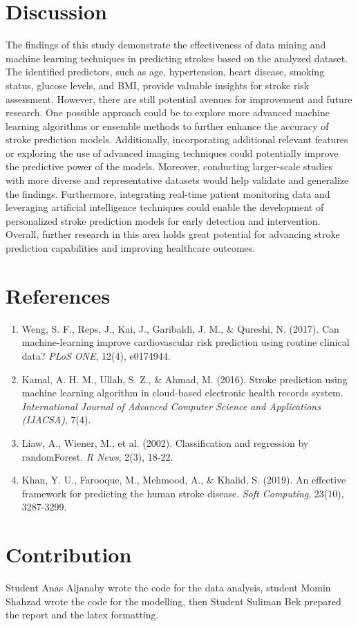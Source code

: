 \documentclass{article}
\begin{document}
\section{Discussion}

 The findings of this study demonstrate the effectiveness of data mining and machine learning techniques in predicting strokes based on the analyzed dataset. The identified predictors, such as age, hypertension, heart disease, smoking status, glucose levels, and BMI, provide valuable insights for stroke risk assessment. However, there are still potential avenues for improvement and future research. One possible approach could be to explore more advanced machine learning algorithms or ensemble methods to further enhance the accuracy of stroke prediction models. Additionally, incorporating additional relevant features or exploring the use of advanced imaging techniques could potentially improve the predictive power of the models. Moreover, conducting larger-scale studies with more diverse and representative datasets would help validate and generalize the findings. Furthermore, integrating real-time patient monitoring data and leveraging artificial intelligence techniques could enable the development of personalized stroke prediction models for early detection and intervention. Overall, further research in this area holds great potential for advancing stroke prediction capabilities and improving healthcare outcomes.

\section{References}

\begin{enumerate}
\item Weng, S. F., Reps, J., Kai, J., Garibaldi, J. M., \& Qureshi, N. (2017).
Can machine-learning improve cardiovascular risk prediction using routine clinical data?
{\em PLoS ONE}, 12(4), e0174944.

\item Kamal, A. H. M., Ullah, S. Z., \& Ahmad, M. (2016).
Stroke prediction using machine learning algorithm in cloud-based electronic health records system.
{\em International Journal of Advanced Computer Science and Applications (IJACSA)}, 7(4).

\item Liaw, A., Wiener, M., et al. (2002).
Classification and regression by randomForest.
{\em R News}, 2(3), 18-22.

\item Khan, Y. U., Farooque, M., Mehmood, A., \& Khalid, S. (2019).
An effective framework for predicting the human stroke disease.
{\em Soft Computing}, 23(10), 3287-3299.
\end{enumerate}



\section{Contribution}

Student Anas Aljanaby wrote the code for the data analysis, student Momin Shahzad wrote the code for the modelling, then Student Suliman Bek prepared the report and the latex formatting.
\end{document}
